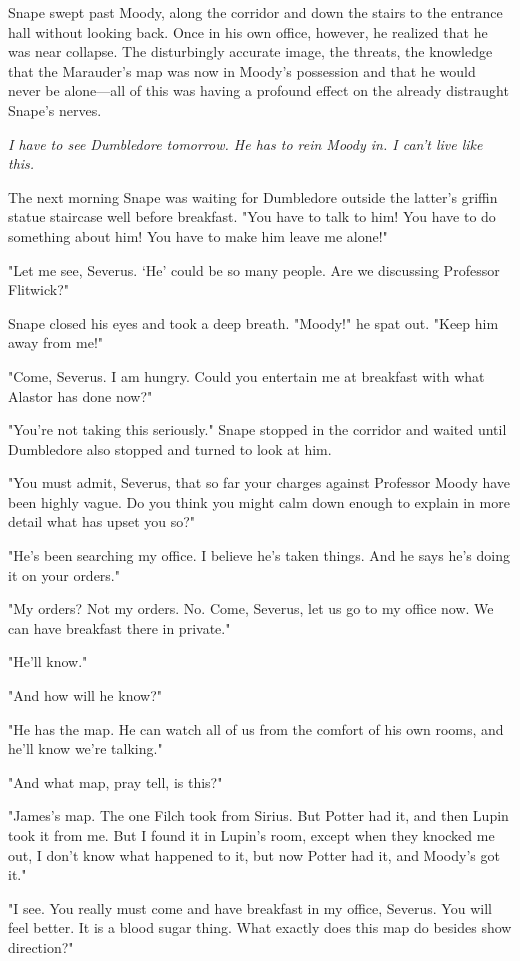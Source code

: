 Snape swept past Moody, along the corridor and down the stairs to the entrance hall without looking back. Once in his own office, however, he realized that he was near collapse. The disturbingly accurate image, the threats, the knowledge that the Marauder's map was now in Moody's possession and that he would never be alone—all of this was having a profound effect on the already distraught Snape's nerves.

\emph{I have to see Dumbledore tomorrow. He has to rein Moody in. I can't live like this.}

The next morning Snape was waiting for Dumbledore outside the latter's griffin statue staircase well before breakfast. "You have to talk to him! You have to do something about him! You have to make him leave me alone!"

"Let me see, Severus. `He' could be so many people. Are we discussing Professor Flitwick?"

Snape closed his eyes and took a deep breath. "Moody!" he spat out. "Keep him away from me!"

"Come, Severus. I am hungry. Could you entertain me at breakfast with what Alastor has done now?"

"You're not taking this seriously." Snape stopped in the corridor and waited until Dumbledore also stopped and turned to look at him.

"You must admit, Severus, that so far your charges against Professor Moody have been highly vague. Do you think you might calm down enough to explain in more detail what has upset you so?"

"He's been searching my office. I believe he's taken things. And he says he's doing it on your orders."

"My orders? Not my orders. No. Come, Severus, let us go to my office now. We can have breakfast there in private."

"He'll know."

"And how will he know?"

"He has the map. He can watch all of us from the comfort of his own rooms, and he'll know we're talking."

"And what map, pray tell, is this?"

"James's map. The one Filch took from Sirius. But Potter had it, and then Lupin took it from me. But I found it in Lupin's room, except when they knocked me out, I don't know what happened to it, but now Potter had it, and Moody's got it."

"I see. You really must come and have breakfast in my office, Severus. You will feel better. It is a blood sugar thing. What exactly does this map do besides show direction?"

